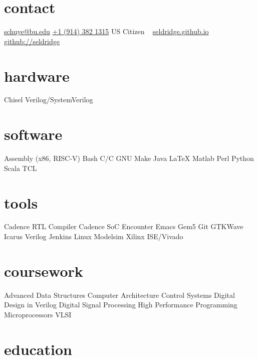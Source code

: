 \documentclass[print]{friggeri-cv} %
\begin{document}


\newcommand{\CPP}
{C\nolinebreak[4]\hspace{-.05em}\raisebox{.22ex}{\footnotesize ++}\xspace}

\begin{aside} %
\section{contact}
\href{mailto:schuye@bu.edu}{schuye@bu.edu}
\href{tel:+19143821315}{+1 (914) 382 1315}
US Citizen
~
\href{https://seldridge.github.io}{seldridge.github.io}
\href{https://github.com/seldridge}{github://seldridge}
\section{hardware}
Chisel
Verilog/SystemVerilog
\section{software}
Assembly (x86, RISC-V)
Bash
C/\CPP
GNU Make
Java
\LaTeX
Matlab
Perl
Python
Scala
TCL
\section{tools}
Cadence RTL Compiler
Cadence SoC Encounter
Emacs
Gem5
Git
GTKWave
Icarus Verilog
Jenkins
Linux
Modelsim
Xilinx ISE/Vivado
\section{coursework}
Advanced Data Structures
Computer Architecture
Control Systems
Digital Design in Verilog
Digital Signal Processing
High Performance Programming
Microprocessors
VLSI
\end{aside}


\section{education}
\end{document}
